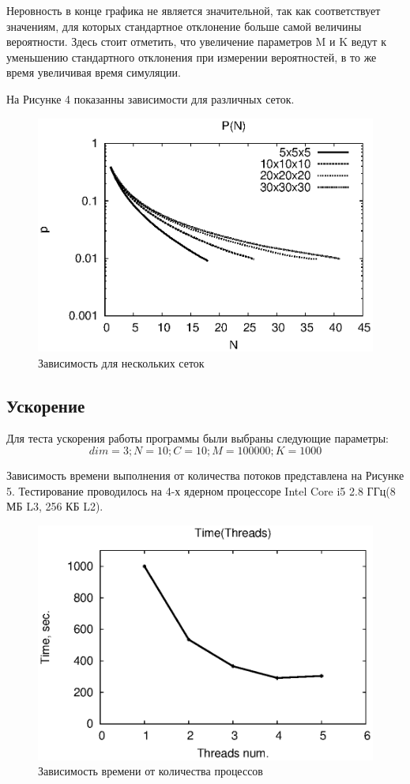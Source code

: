 \documentclass{article}
\begin{document}
    Неровность в конце графика не является значительной, так как соответствует значениям, для которых стандартное отклонение больше самой величины вероятности. Здесь стоит отметить, что увеличение параметров M и K ведут к уменьшению стандартного отклонения при измерении вероятностей, в то же время увеличивая время симуляции.

    На Рисунке 4 показанны зависимости для различных сеток.

    \begin{figure}[ht]
        \centering
        \includegraphics[scale=0.6]{2.eps}
        \caption{Зависимость для нескольких сеток}
    \end{figure}

    \pagebreak

    \subsection{Ускорение}
    Для теста ускорения работы программы были выбраны следующие параметры:
    $$dim = 3;  N = 10;  C = 10;  M = 100000;  K = 1000$$

    Зависимость времени выполнения от количества потоков представлена на Рисунке 5. Тестирование проводилось на 4-х ядерном процессоре Intel Core i5 2.8 ГГц(8 МБ L3, 256 КБ L2).
    \begin{figure}[ht]
        \centering
        \includegraphics[scale=0.75]{3.eps}
        \caption{Зависимость времени от количества процессов}
    \end{figure}
\end{document}
